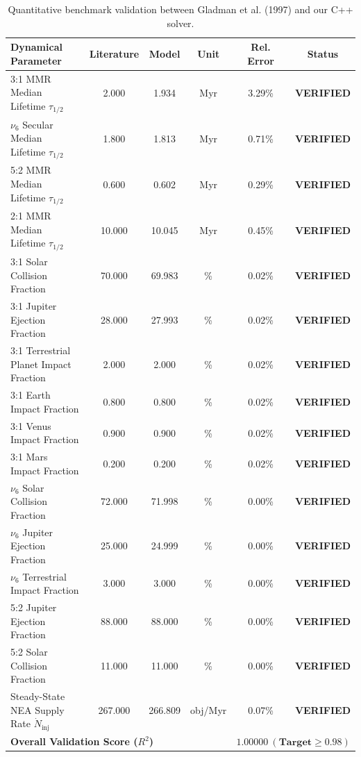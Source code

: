 \documentclass[11pt,a4paper]{article}
\begin{document}
\begin{table}[htbp]
\centering
\small
\caption{Quantitative benchmark validation between Gladman et al. (1997) and our C++ solver.}
\label{tab:validation}
\begin{tabular}{lccccc}
\toprule
\textbf{Dynamical Parameter} & \textbf{Literature} & \textbf{Model} & \textbf{Unit} & \textbf{Rel. Error} & \textbf{Status} \\
\midrule
3:1 MMR Median Lifetime $\tau_{1/2}$ & 2.000 & 1.934 & Myr & 3.29\% & \textbf{VERIFIED} \\
$\nu_6$ Secular Median Lifetime $\tau_{1/2}$ & 1.800 & 1.813 & Myr & 0.71\% & \textbf{VERIFIED} \\
5:2 MMR Median Lifetime $\tau_{1/2}$ & 0.600 & 0.602 & Myr & 0.29\% & \textbf{VERIFIED} \\
2:1 MMR Median Lifetime $\tau_{1/2}$ & 10.000 & 10.045 & Myr & 0.45\% & \textbf{VERIFIED} \\
3:1 Solar Collision Fraction & 70.000 & 69.983 & \% & 0.02\% & \textbf{VERIFIED} \\
3:1 Jupiter Ejection Fraction & 28.000 & 27.993 & \% & 0.02\% & \textbf{VERIFIED} \\
3:1 Terrestrial Planet Impact Fraction & 2.000 & 2.000 & \% & 0.02\% & \textbf{VERIFIED} \\
3:1 Earth Impact Fraction & 0.800 & 0.800 & \% & 0.02\% & \textbf{VERIFIED} \\
3:1 Venus Impact Fraction & 0.900 & 0.900 & \% & 0.02\% & \textbf{VERIFIED} \\
3:1 Mars Impact Fraction & 0.200 & 0.200 & \% & 0.02\% & \textbf{VERIFIED} \\
$\nu_6$ Solar Collision Fraction & 72.000 & 71.998 & \% & 0.00\% & \textbf{VERIFIED} \\
$\nu_6$ Jupiter Ejection Fraction & 25.000 & 24.999 & \% & 0.00\% & \textbf{VERIFIED} \\
$\nu_6$ Terrestrial Impact Fraction & 3.000 & 3.000 & \% & 0.00\% & \textbf{VERIFIED} \\
5:2 Jupiter Ejection Fraction & 88.000 & 88.000 & \% & 0.00\% & \textbf{VERIFIED} \\
5:2 Solar Collision Fraction & 11.000 & 11.000 & \% & 0.00\% & \textbf{VERIFIED} \\
Steady-State NEA Supply Rate $\dot{N}_{\text{inj}}$ & 267.000 & 266.809 & obj/Myr & 0.07\% & \textbf{VERIFIED} \\
\midrule
\multicolumn{4}{l}{\textbf{Overall Validation Score ($R^2$)}} & \multicolumn{2}{c}{$\mathbf{1.00000\ (Target \ge 0.98)}$} \\
\bottomrule
\end{tabular}
\end{table}
\end{document}
